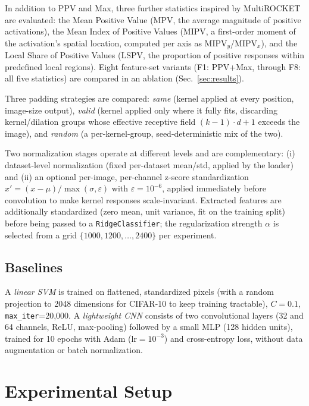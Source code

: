 \documentclass[a4paper,fleqn]{cas-sc}
\begin{document}
In addition to PPV and Max, three further statistics inspired by MultiROCKET \citep{tan2022multirocket} are evaluated: the Mean Positive Value (MPV, the average magnitude of positive activations), the Mean Index of Positive Values (MIPV, a first-order moment of the activation's spatial location, computed per axis as MIPV$_y$/MIPV$_x$), and the Local Share of Positive Values (LSPV, the proportion of positive responses within predefined local regions). Eight feature-set variants (F1: PPV+Max, through F8: all five statistics) are compared in an ablation (Sec.~\ref{sec:results}).

Three padding strategies are compared: \emph{same} (kernel applied at every position, image-size output), \emph{valid} (kernel applied only where it fully fits, discarding kernel/dilation groups whose effective receptive field $(k-1)\cdot d + 1$ exceeds the image), and \emph{random} (a per-kernel-group, seed-deterministic mix of the two).

Two normalization stages operate at different levels and are complementary: (i) dataset-level normalization (fixed per-dataset mean/std, applied by the loader) and (ii) an optional per-image, per-channel z-score standardization $x' = (x-\mu)/\max(\sigma,\varepsilon)$ with $\varepsilon=10^{-6}$, applied immediately before convolution to make kernel responses scale-invariant. Extracted features are additionally standardized (zero mean, unit variance, fit on the training split) before being passed to a \texttt{RidgeClassifier}; the regularization strength $\alpha$ is selected from a grid $\{1000,1200,\dots,2400\}$ per experiment.

\subsection{Baselines}
A \emph{linear SVM} is trained on flattened, standardized pixels (with a random projection to 2048 dimensions for CIFAR-10 to keep training tractable), $C=0.1$, \texttt{max\_iter}=20{,}000. A \emph{lightweight CNN} consists of two convolutional layers (32 and 64 channels, ReLU, max-pooling) followed by a small MLP (128 hidden units), trained for 10 epochs with Adam ($\text{lr}=10^{-3}$) and cross-entropy loss, without data augmentation or batch normalization.

\section{Experimental Setup}\label{sec:setup}
\end{document}
